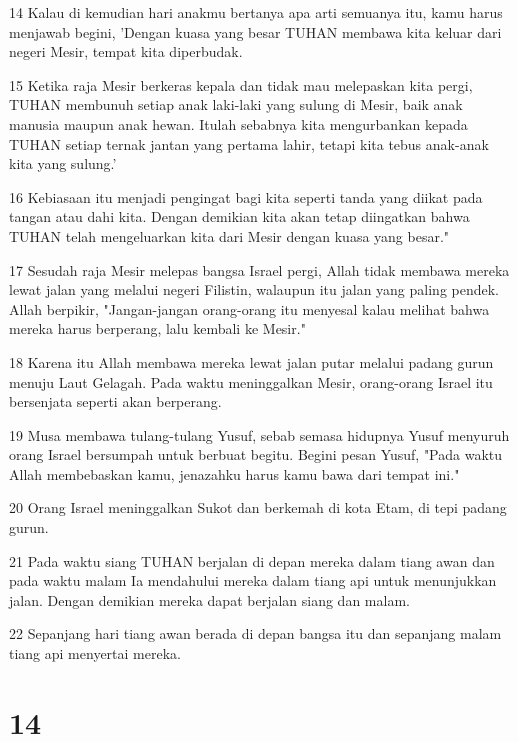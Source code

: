 \par 14 Kalau di kemudian hari anakmu bertanya apa arti semuanya itu, kamu harus menjawab begini, 'Dengan kuasa yang besar TUHAN membawa kita keluar dari negeri Mesir, tempat kita diperbudak.
\par 15 Ketika raja Mesir berkeras kepala dan tidak mau melepaskan kita pergi, TUHAN membunuh setiap anak laki-laki yang sulung di Mesir, baik anak manusia maupun anak hewan. Itulah sebabnya kita mengurbankan kepada TUHAN setiap ternak jantan yang pertama lahir, tetapi kita tebus anak-anak kita yang sulung.'
\par 16 Kebiasaan itu menjadi pengingat bagi kita seperti tanda yang diikat pada tangan atau dahi kita. Dengan demikian kita akan tetap diingatkan bahwa TUHAN telah mengeluarkan kita dari Mesir dengan kuasa yang besar."
\par 17 Sesudah raja Mesir melepas bangsa Israel pergi, Allah tidak membawa mereka lewat jalan yang melalui negeri Filistin, walaupun itu jalan yang paling pendek. Allah berpikir, "Jangan-jangan orang-orang itu menyesal kalau melihat bahwa mereka harus berperang, lalu kembali ke Mesir."
\par 18 Karena itu Allah membawa mereka lewat jalan putar melalui padang gurun menuju Laut Gelagah. Pada waktu meninggalkan Mesir, orang-orang Israel itu bersenjata seperti akan berperang.
\par 19 Musa membawa tulang-tulang Yusuf, sebab semasa hidupnya Yusuf menyuruh orang Israel bersumpah untuk berbuat begitu. Begini pesan Yusuf, "Pada waktu Allah membebaskan kamu, jenazahku harus kamu bawa dari tempat ini."
\par 20 Orang Israel meninggalkan Sukot dan berkemah di kota Etam, di tepi padang gurun.
\par 21 Pada waktu siang TUHAN berjalan di depan mereka dalam tiang awan dan pada waktu malam Ia mendahului mereka dalam tiang api untuk menunjukkan jalan. Dengan demikian mereka dapat berjalan siang dan malam.
\par 22 Sepanjang hari tiang awan berada di depan bangsa itu dan sepanjang malam tiang api menyertai mereka.

\chapter{14}

